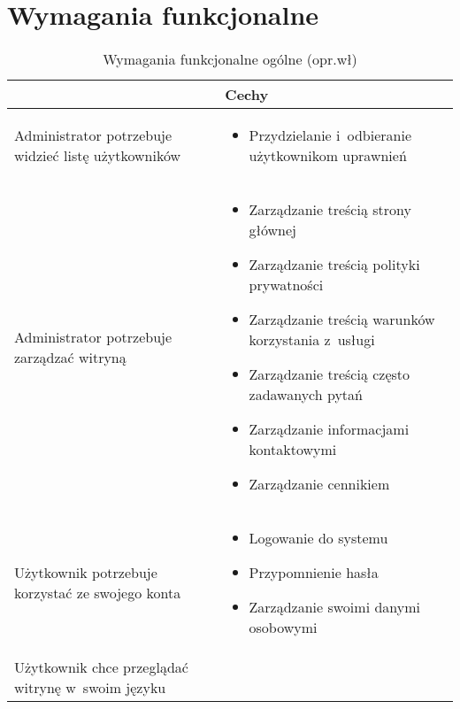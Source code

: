\section{Wymagania funkcjonalne}\label{sec:functional-requirements}
\noindent
\begin{minipage}{\textwidth}
    \begin{table}[H]
        \centering\caption{Wymagania funkcjonalne ogólne (opr.wł)\label{tabela:wymaganiaFunkcjonalneOgolne}}
        \begin{tabular}{|P{.3\textwidth}|P{.6\textwidth}|}
            \hline
             & Cechy \\

            \hline
            Administrator potrzebuje widzieć listę użytkowników &
            \begin{itemize}
                \item Przydzielanie i~odbieranie użytkownikom uprawnień
            \end{itemize} \\
            \hline
            Administrator potrzebuje zarządzać witryną &
            \begin{itemize}
                \item Zarządzanie treścią strony głównej
                \item Zarządzanie treścią polityki prywatności
                \item Zarządzanie treścią warunków korzystania z~usługi
                \item Zarządzanie treścią często zadawanych pytań
                \item Zarządzanie informacjami kontaktowymi
                \item Zarządzanie cennikiem
            \end{itemize} \\
            \hline
            Użytkownik potrzebuje korzystać ze swojego konta &
            \begin{itemize}
                \item Logowanie do systemu
                \item Przypomnienie hasła
                \item Zarządzanie swoimi danymi osobowymi
            \end{itemize} \\
            \hline
            Użytkownik chce przeglądać witrynę w~swoim języku &
            \begin{itemize}

\end{itemize}
\end{tabular}
\end{table}
\end{minipage}
